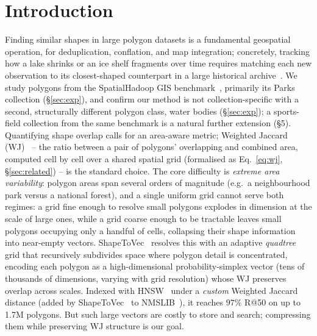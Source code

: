 \documentclass[sigconf]{acmart}
\begin{document}
\section{Introduction}
\label{sec:intro}
Finding similar shapes in large polygon datasets is a fundamental geospatial
operation, for deduplication, conflation, and map integration; concretely, tracking
how a lake shrinks or an ice shelf fragments over time requires matching each new
observation to its closest-shaped counterpart in a large historical
archive~\cite{shape2vec}. We study
polygons from the SpatialHadoop GIS benchmark~\cite{eldawy15}, primarily its
Parks collection (\S\ref{sec:exp}), and confirm our method is not
collection-specific with a second, structurally different polygon class, water
bodies (\S\ref{sec:exp}); a sports-field collection from the same benchmark is a
natural further extension (\S5). Quantifying
shape overlap calls for an area-aware metric; Weighted Jaccard (WJ)~\cite{rajaraman11}
-- the ratio between a pair of polygons' overlapping and combined area, computed cell
by cell over a shared spatial grid (formalised as Eq.~\ref{eq:wj}, \S\ref{sec:related})
-- is the standard choice. The core difficulty is
\emph{extreme area variability}: polygon areas span several orders of magnitude
(e.g.\ a neighbourhood park versus a national forest), and a single uniform grid
cannot serve both regimes: a grid fine enough to resolve small polygons explodes in
dimension at the scale of large ones, while a grid coarse enough to be tractable
leaves small polygons occupying only a handful of cells, collapsing their shape
information into near-empty vectors. ShapeToVec~\cite{shape2vec} resolves this with an adaptive
\emph{quadtree} grid that recursively subdivides space where polygon detail is
concentrated, encoding each polygon as a high-dimensional probability-simplex
vector (tens of thousands of dimensions, varying with grid resolution) whose WJ
preserves overlap across scales. Indexed with HNSW~\cite{hnsw20} under a \emph{custom}
Weighted Jaccard distance (added by ShapeToVec~\cite{shape2vec} to
NMSLIB~\cite{boytsov13}), it reaches $97\%$ R@50
on up to 1.7M polygons. But such large vectors are costly to store and search;
compressing them while preserving WJ structure is our goal.
\end{document}
